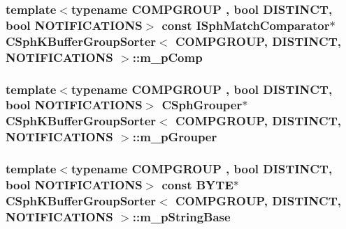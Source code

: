 \hypertarget{classCSphKBufferGroupSorter_af20c745bde2af6c96c8166f598f1c3f7}{
\subsubsection[{m\-\_\-p\-Comp}]{\setlength{\rightskip}{0pt plus 5cm}template$<$typename C\-O\-M\-P\-G\-R\-O\-U\-P , bool D\-I\-S\-T\-I\-N\-C\-T, bool N\-O\-T\-I\-F\-I\-C\-A\-T\-I\-O\-N\-S$>$ const {\bf I\-Sph\-Match\-Comparator}$\ast$ {\bf C\-Sph\-K\-Buffer\-Group\-Sorter}$<$ C\-O\-M\-P\-G\-R\-O\-U\-P, D\-I\-S\-T\-I\-N\-C\-T, N\-O\-T\-I\-F\-I\-C\-A\-T\-I\-O\-N\-S $>$\-::m\-\_\-p\-Comp\hspace{0.3cm}{\ttfamily [protected]}}}\label{classCSphKBufferGroupSorter_af20c745bde2af6c96c8166f598f1c3f7}
\hypertarget{classCSphKBufferGroupSorter_a5fd43724c6c36da29c93d51daa28f907}{
\subsubsection[{m\-\_\-p\-Grouper}]{\setlength{\rightskip}{0pt plus 5cm}template$<$typename C\-O\-M\-P\-G\-R\-O\-U\-P , bool D\-I\-S\-T\-I\-N\-C\-T, bool N\-O\-T\-I\-F\-I\-C\-A\-T\-I\-O\-N\-S$>$ {\bf C\-Sph\-Grouper}$\ast$ {\bf C\-Sph\-K\-Buffer\-Group\-Sorter}$<$ C\-O\-M\-P\-G\-R\-O\-U\-P, D\-I\-S\-T\-I\-N\-C\-T, N\-O\-T\-I\-F\-I\-C\-A\-T\-I\-O\-N\-S $>$\-::m\-\_\-p\-Grouper\hspace{0.3cm}{\ttfamily [protected]}}}\label{classCSphKBufferGroupSorter_a5fd43724c6c36da29c93d51daa28f907}
\hypertarget{classCSphKBufferGroupSorter_a7d56d9cb73e353fb6cf77ea673c871ef}{
\subsubsection[{m\-\_\-p\-String\-Base}]{\setlength{\rightskip}{0pt plus 5cm}template$<$typename C\-O\-M\-P\-G\-R\-O\-U\-P , bool D\-I\-S\-T\-I\-N\-C\-T, bool N\-O\-T\-I\-F\-I\-C\-A\-T\-I\-O\-N\-S$>$ const {\bf B\-Y\-T\-E}$\ast$ {\bf C\-Sph\-K\-Buffer\-Group\-Sorter}$<$ C\-O\-M\-P\-G\-R\-O\-U\-P, D\-I\-S\-T\-I\-N\-C\-T, N\-O\-T\-I\-F\-I\-C\-A\-T\-I\-O\-N\-S $>$\-::m\-\_\-p\-String\-Base\hspace{0.3cm}{\ttfamily [protected]}}}\label{classCSphKBufferGroupSorter_a7d56d9cb73e353fb6cf77ea673c871ef}
